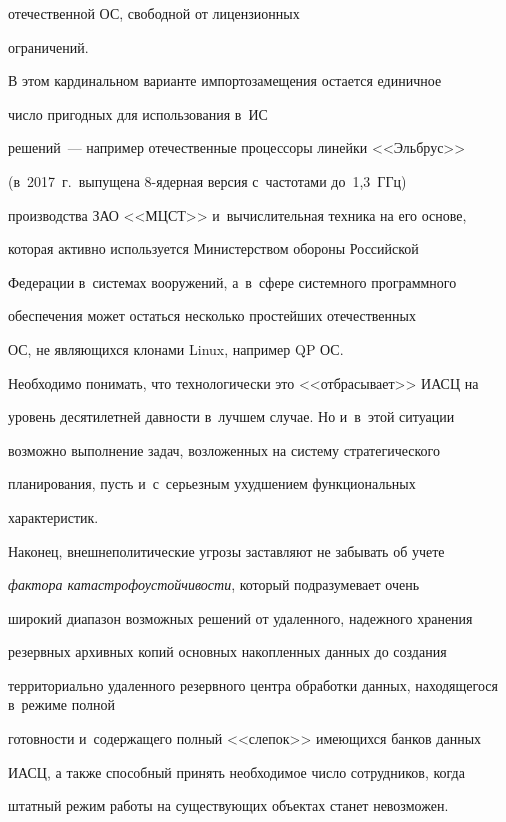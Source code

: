 отечественной ОС, свободной от лицензионных 


ограничений.


     


     В этом кардинальном варианте импортозамещения остается единичное 


чис\-ло пригодных для использования в~ИС 


 решений~--- например отечественные процессоры линейки <<Эльбрус>> 


(в~2017~г.\ выпущена 8-ядер\-ная версия с~частотами до~1,3~ГГц) 


производства ЗАО <<МЦСТ>> и~вы\-чис\-ли\-тель\-ная техника на его основе, 


которая активно используется Министерством обороны Российской 


Федерации в~системах вооружений, а~в~сфере системного программного 


обеспечения может остаться несколько простейших отечественных 


ОС, не являющихся клонами Linux, например QP ОС. 


Необходимо понимать, что технологически это <<отбрасывает>> ИАСЦ на 


уровень десятилетней давности в~лучшем случае. Но и~в~этой ситуации 


возможно выполнение задач, возложенных на систему стратегического 


планирования, пусть и~с~серьезным ухудшением функциональных 


характеристик.


     


     Наконец, внешнеполитические угрозы заставляют не забывать об учете 


\textit{фактора катастрофоустойчивости}, который подразумевает очень 


широкий диапазон возможных решений от удаленного, надежного хранения 


резервных архивных копий основных накопленных данных до создания 


территориально удаленного резервного центра обработки данных, находящегося в~режиме полной 


готовности и~содержащего полный <<слепок>> имеющихся банков данных 


ИАСЦ, а также способный принять необходимое число сотрудников, когда 


штатный режим работы на существующих объектах станет невозможен.





